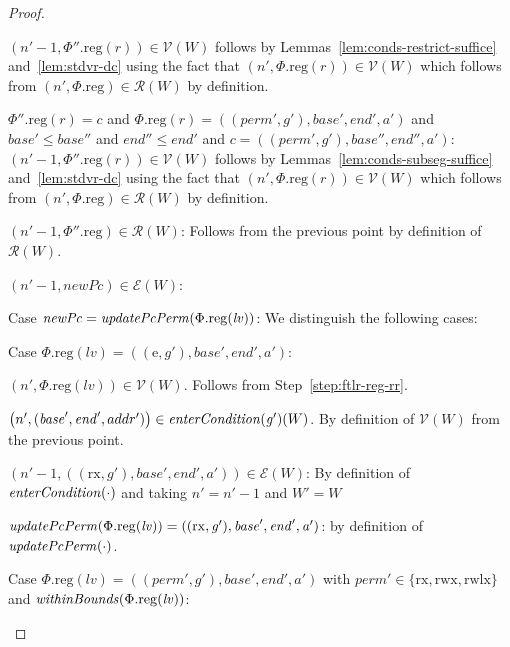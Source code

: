 \documentclass[a4paper]{article}
\newcommand{\var}[1]{\mathit{#1}}
\newcommand{\lv}{\var{lv}}
\newcommand{\gl}{\var{g}}
\newcommand{\addr}{\var{a}}
\newcommand{\start}{\var{base}}
\newcommand{\addrend}{\var{end}}
\newcommand{\perm}{\var{perm}}
\newcommand{\plainproj}[1]{\mathrm{#1}}
\newcommand{\memreg}[1][\Phi]{#1.\plainproj{reg}}
\newcommand{\plainfun}[2]{
  \ifthenelse{\equal{#2}{}}
  {\mathit{#1}}
  {\mathit{#1}(#2)}
}
\newcommand{\updatePcPerm}[1]{\plainfun{updatePcPerm}{#1}}
\newcommand{\withinBounds}[1]{\plainfun{withinBounds}{#1}}
\newcommand{\entryCond}[1]{\plainfun{enterCondition}{#1}}
\newcommand{\asmType}{\plaindom{AsmType}}
\newcommand{\plaindom}[1]{\mathrm{#1}}
\newcommand{\intr}[2]{\mathcal{#1}}
\newcommand{\valueintr}[1]{\intr{V}{#1}}
\newcommand{\exprintr}[1]{\intr{E}{#1}}
\newcommand{\regintr}[1]{\intr{R}{#1}}
\newcommand{\stdvr}{\valueintr{\asmType}}
\newcommand{\stder}{\exprintr{\asmType}}
\newcommand{\stdrr}{\regintr{\asmType}}
\newcommand{\npair}[2][n]{\left(#1,#2 \right)}
\newcommand{\plainperm}[1]{\mathrm{#1}}
\newcommand{\exec}{\plainperm{rx}}
\newcommand{\entry}{\plainperm{e}}
\newcommand{\rwx}{\plainperm{rwx}}
\newcommand{\rwlx}{\plainperm{rwlx}}
\begin{document}
\begin{proof}
\begin{enumproof}
\begin{enumproof}
\begin{enumproof}
        $\npair[n'-1]{\memreg[\Phi''](r)} \in \stdvr(W)$ follows by
        Lemmas~\ref{lem:conds-restrict-suffice} and~\ref{lem:stdvr-dc} using the
        fact that $\npair[n']{\memreg(r)}\in\stdvr(W)$
        which follows from $\npair[n']{\memreg}\in\stdrr(W)$ by
        definition.
      \item $\memreg[\Phi''](r) = \var{c}$ and $\memreg(r) =
        ((\perm',\gl'),\start',\addrend',\addr')$ and $\start' \leq \start''$ and
        $\addrend'' \leq \addrend'$ and $c =
        ((\perm',\gl'),\start'',\addrend'',\addr')$: \\
        $\npair[n'-1]{\memreg[\Phi''](r)} \in \stdvr(W)$ follows by
        Lemmas~\ref{lem:conds-subseg-suffice} and~\ref{lem:stdvr-dc} using the
        fact that $\npair[n']{\memreg(r)}\in\stdvr(W)$
        which follows from $\npair[n']{\memreg}\in\stdrr(W)$ by definition.
      \end{enumproof}
    \item $\npair[n'-1]{\memreg[\Phi'']}\in\stdrr(W)$: Follows from the previous
      point by definition of $\stdrr(W)$.
    \item $\npair[n'-1]{\var{newPc}} \in \stder(W)$:
      \begin{enumproof}
      \item Case $\var{newPc}= \updatePcPerm{\memreg(\lv)}$: We distinguish the
        following cases:
        \begin{enumproof}
        \item Case $\memreg(\lv) = ((\entry,\gl'),\start',\addrend',\addr')$:
          \begin{enumproof}
          \item $\npair[n']{\memreg(\lv)} \in \stdvr(W)$.  Follows from
            Step~\ref{step:ftlr-reg-rr}.
          \item $\npair[n']{(\start',\addrend',addr')} \in \entryCond{\gl'}(W)$.
            By definition of $\stdvr(W)$ from the previous point.
          \item $\npair[n'-1]{((\exec,\gl'),\start',\addrend',\addr')} \in
            \stder(W)$: By definition of $\entryCond{\cdot}$ and taking $n' =
            n'-1$ and $W' = W$
          \item $\updatePcPerm{\memreg(\lv)} =
            ((\exec,\gl'),\start',\addrend',\addr')$: by definition of $\updatePcPerm{\cdot}$.
          \end{enumproof}
        \item Case $\memreg(\lv) = ((\perm',\gl'),\start',\addrend',\addr')$
          with $\perm' \in \{\exec,\rwx,\rwlx\}$ and $\withinBounds{\memreg(\lv)}$:

\end{enumproof}
\end{enumproof}
\end{enumproof}
\end{enumproof}
\end{proof}
\end{document}
